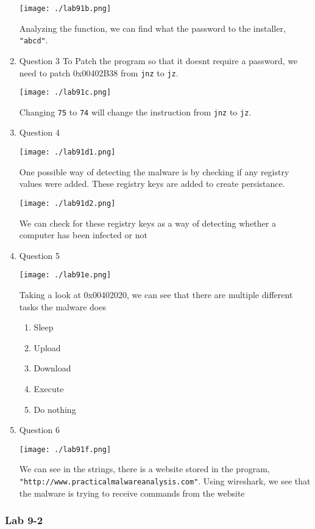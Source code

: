 \documentclass[11pt]{article}
\begin{document}
\begin{enumerate}
\begin{center}
\texttt{[image: ./lab91b.png]}
\end{center}

Analyzing the function, we can find what the password to the installer, \texttt{"abcd"}.
\item Question 3
\label{sec:org902073d}
To Patch the program so that it doesnt require a password, we need to patch 0x00402B38 from \texttt{jnz} to \texttt{jz}. 

\begin{center}
\texttt{[image: ./lab91c.png]}
\end{center}

Changing \texttt{75} to \texttt{74} will change the instruction from \texttt{jnz} to \texttt{jz}.

\item Question 4
\label{sec:org4c14715}
\begin{center}
\texttt{[image: ./lab91d1.png]}
\end{center}

One possible way of detecting the malware is by checking if any registry values were added. These registry keys are added to create persistance.

\begin{center}
\texttt{[image: ./lab91d2.png]}
\end{center}

We can check for these registry keys as a way of detecting whether a computer has been infected or not
\item Question 5
\label{sec:org4e64f8a}
\begin{center}
\texttt{[image: ./lab91e.png]}
\end{center}
Taking a look at 0x00402020, we can see that there are multiple different tasks the malware does

\begin{enumerate}
\item Sleep

\item Upload

\item Download

\item Execute

\item Do nothing
\end{enumerate}
\item Question 6
\label{sec:orgad483d7}
\begin{center}
\texttt{[image: ./lab91f.png]}
\end{center}
We can see in the strings, there is a website stored in the program, \texttt{"http://www.practicalmalwareanalysis.com"}. Using wireshark, we see that the malware is trying to receive commands from the website
\end{enumerate}
\subsubsection{Lab 9-2}
\label{sec:org380ae6f}
\end{document}

